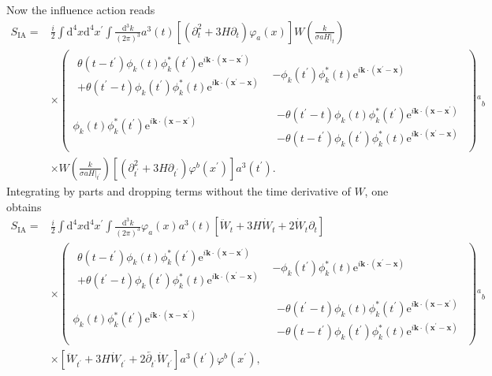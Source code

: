 \documentclass[aps, prd
, preprint
, nofootinbib 
]{revtex4-1}
\newcommand{\dd}{\mathrm{d}}
\newcommand{\ee}{\mathrm{e}}
\newcommand{\dk}{\frac{\dd^3k}{(2\pi)^3}}
\newcommand{\bae}[1]{\begin{align} #1 \end{align}}
\newcommand{\bpme}[1]{\begin{pmatrix} #1 \end{pmatrix}}
\begin{document}
\bigskip
Now the influence action reads
\bae{
	S_\text{IA}=&\frac{i}{2}\int\dd^4x\dd^4x^\prime\int\dk a^3(t)\left[(\partial_t^2+3H\partial_t)\varphi_a(x)\right]
	W\left(\frac{k}{\sigma aH|_t}\right) \nonumber \\
	&\times\bpme{
		\begin{array}{c}
			\theta(t-t^\prime)\phi_k(t)\phi_{k}^*(t^\prime)\ee^{i\mathbf{k}\cdot(\mathbf{x}-\mathbf{x}^\prime)} \\
			+\theta(t^\prime-t)\phi_{k}(t^\prime)\phi_k^{*}(t)\ee^{i\mathbf{k}\cdot(\mathbf{x}^\prime-\mathbf{x})}
		\end{array} &
		-\phi_{k}(t^\prime)\phi_k^{*}(t)\ee^{i\mathbf{k}\cdot(\mathbf{x}^\prime-\mathbf{x})} \\
		\phi_k(t)\phi_{k}^*(t^\prime)\ee^{i\mathbf{k}\cdot(\mathbf{x}-\mathbf{x}^\prime)} &
		\begin{array}{c}
			-\theta(t^\prime-t)\phi_k(t)\phi_{k}^*(t^\prime)\ee^{i\mathbf{k}\cdot(\mathbf{x}-\mathbf{x}^\prime)} \\
			-\theta(t-t^\prime)\phi_{k}(t^\prime)\phi_k^{*}(t)\ee^{i\mathbf{k}\cdot(\mathbf{x}^\prime-\mathbf{x})}
		\end{array}
	}{}^a{}_b \nonumber \\
	&\times W\left(\frac{k}{\sigma aH|_{t^\prime}}\right)
	\left[(\partial_{t^\prime}^2+3H\partial_{t^\prime})\varphi^b(x^\prime)\right]a^3(t^\prime).
}
Integrating by parts and dropping terms without the time derivative of $W$, one obtains
\bae{
	S_\text{IA}=&\frac{i}{2}\int\dd^4x\dd^4x^\prime\int\dk\varphi_a(x)a^3(t)[\ddot{W}_t+3H\dot{W}_t+2\dot{W}_t\partial_t] \nonumber \\
	&\times\bpme{
		\begin{array}{c}
			\theta(t-t^\prime)\phi_k(t)\phi_{k}^*(t^\prime)\ee^{i\mathbf{k}\cdot(\mathbf{x}-\mathbf{x}^\prime)} \\
			+\theta(t^\prime-t)\phi_{k}(t^\prime)\phi_k^{*}(t)\ee^{i\mathbf{k}\cdot(\mathbf{x}^\prime-\mathbf{x})}
		\end{array} &
		-\phi_{k}(t^\prime)\phi_k^{*}(t)\ee^{i\mathbf{k}\cdot(\mathbf{x}^\prime-\mathbf{x})} \\
		\phi_k(t)\phi_{k}^*(t^\prime)\ee^{i\mathbf{k}\cdot(\mathbf{x}-\mathbf{x}^\prime)} &
		\begin{array}{c}
			-\theta(t^\prime-t)\phi_k(t)\phi_{k}^*(t^\prime)\ee^{i\mathbf{k}\cdot(\mathbf{x}-\mathbf{x}^\prime)} \\
			-\theta(t-t^\prime)\phi_{k}(t^\prime)\phi_k^{*}(t)\ee^{i\mathbf{k}\cdot(\mathbf{x}^\prime-\mathbf{x})}
		\end{array}
	}{}^a{}_b \nonumber \\
	&\times[\ddot{W}_{t^\prime}+3H\dot{W}_{t^\prime}+2\overleftarrow{\partial_{t^\prime}}\dot{W}_{t^\prime}]a^3(t^\prime)\varphi^b(x^\prime),
}
\end{document}
